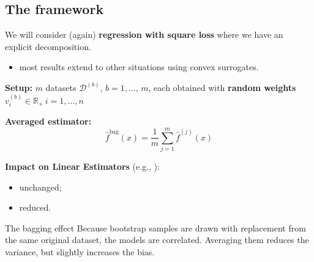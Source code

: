 \documentclass[
11pt,notheorems,hyperref={pdfauthor=whatever}
]{beamer}
\begin{document}
\subsection{The framework}
\begin{frame}
    We will consider (again) \alert{\textbf{regression with square loss}} where we have an explicit  decomposition.
    \begin{itemize}
        \item most results extend to other situations using convex surrogates.
    \end{itemize}

    \textbf{Setup:} \(m\) datasets \(\mathcal{D}^{(b)}\), \(b=1,\dots,\,m\), each obtained with \alert{\textbf{random weights}} \(v_i^{(b)}\in\mathbb{R}_+\,i=1,\dots,n\)
    
    \vspace{0.5em}
    \textbf{Averaged estimator:}
    \[
        \hat{f}^{\text{bag}}(x) = \frac{1}{m} \sum_{j=1}^m \hat{f}^{(j)}(x)
    \]

    \vspace{0.5em}
    \textbf{Impact on Linear Estimators} (e.g., ):
    \begin{itemize}
        \item {} unchanged;
        \item {} reduced.
    \end{itemize}

    \vspace{0.5em}
    \begin{block}{The bagging effect}
        Because bootstrap samples are drawn with replacement from the same original dataset, the models are correlated. Averaging them reduces the variance, but slightly increases the bias.
    \end{block}
\end{frame}
\end{document}
